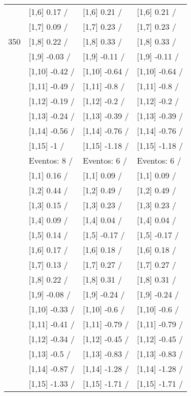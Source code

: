 \begin{table}
\begin{tabular}[t]{llll}
 & {}[1,6] 0.17  / & {}[1,6] 0.21  / & {}[1,6] 0.21  /\\
 & {}[1,7] 0.09  / & {}[1,7] 0.23  / & {}[1,7] 0.23  /\\
350 & {}[1,8] 0.22  / & {}[1,8] 0.33  / & {}[1,8] 0.33  /\\
\addlinespace
 & {}[1,9] -0.03  / & {}[1,9] -0.11  / & {}[1,9] -0.11  /\\
 & {}[1,10] -0.42  / & {}[1,10] -0.64  / & {}[1,10] -0.64  /\\
 & {}[1,11] -0.49  / & {}[1,11] -0.8  / & {}[1,11] -0.8  /\\
 & {}[1,12] -0.19  / & {}[1,12] -0.2  / & {}[1,12] -0.2  /\\
 & {}[1,13] -0.24  / & {}[1,13] -0.39  / & {}[1,13] -0.39  /\\
\addlinespace
 & {}[1,14] -0.56  / & {}[1,14] -0.76  / & {}[1,14] -0.76  /\\
 & {}[1,15] -1  / & {}[1,15] -1.18  / & {}[1,15] -1.18  /\\
 & Eventos:  8 / & Eventos:  6 / & Eventos:  6 /\\
 & {}[1,1] 0.16  / & {}[1,1] 0.09  / & {}[1,1] 0.09  /\\
 & {}[1,2] 0.44  / & {}[1,2] 0.49  / & {}[1,2] 0.49  /\\
\addlinespace
 & {}[1,3] 0.15  / & {}[1,3] 0.23  / & {}[1,3] 0.23  /\\
 & {}[1,4] 0.09  / & {}[1,4] 0.04  / & {}[1,4] 0.04  /\\
 & {}[1,5] 0.14  / & {}[1,5] -0.17  / & {}[1,5] -0.17  /\\
 & {}[1,6] 0.17  / & {}[1,6] 0.18  / & {}[1,6] 0.18  /\\
 & {}[1,7] 0.13  / & {}[1,7] 0.27  / & {}[1,7] 0.27  /\\
\addlinespace
500 & {}[1,8] 0.22  / & {}[1,8] 0.31  / & {}[1,8] 0.31  /\\
 & {}[1,9] -0.08  / & {}[1,9] -0.24  / & {}[1,9] -0.24  /\\
 & {}[1,10] -0.33  / & {}[1,10] -0.6  / & {}[1,10] -0.6  /\\
 & {}[1,11] -0.41  / & {}[1,11] -0.79  / & {}[1,11] -0.79  /\\
 & {}[1,12] -0.34  / & {}[1,12] -0.45  / & {}[1,12] -0.45  /\\
\addlinespace
 & {}[1,13] -0.5  / & {}[1,13] -0.83  / & {}[1,13] -0.83  /\\
 & {}[1,14] -0.87  / & {}[1,14] -1.28  / & {}[1,14] -1.28  /\\
 & {}[1,15] -1.33  / & {}[1,15] -1.71  / & {}[1,15] -1.71  /\\
\bottomrule
\end{tabular}
\end{table}
